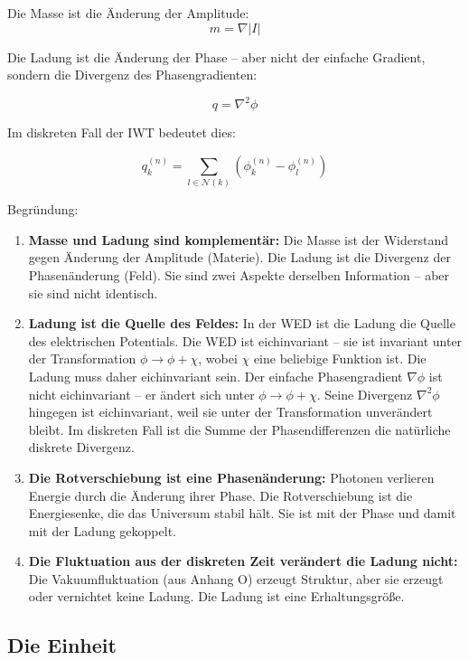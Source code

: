 Die Masse ist die Änderung der Amplitude:
\[
m = \nabla |I|
\]

Die Ladung ist die Änderung der Phase – aber nicht der einfache Gradient, sondern die Divergenz des Phasengradienten:

\[
q = \nabla^2 \phi
\]

Im diskreten Fall der IWT bedeutet dies:

\[
\boxed{q_k^{(n)} = \sum_{l \in \mathcal{N}(k)} \left( \phi_k^{(n)} - \phi_l^{(n)} \right)}
\]

Begründung:

\begin{enumerate}
\item \textbf{Masse und Ladung sind komplementär:} Die Masse ist der Widerstand gegen Änderung der Amplitude (Materie). Die Ladung ist die Divergenz der Phasenänderung (Feld). Sie sind zwei Aspekte derselben Information – aber sie sind nicht identisch.

\item \textbf{Ladung ist die Quelle des Feldes:} In der WED ist die Ladung die Quelle des elektrischen Potentials. Die WED ist eichinvariant – sie ist invariant unter der Transformation \( \phi \to \phi + \chi \), wobei \( \chi \) eine beliebige Funktion ist. Die Ladung muss daher eichinvariant sein. Der einfache Phasengradient \( \nabla \phi \) ist nicht eichinvariant – er ändert sich unter \( \phi \to \phi + \chi \). Seine Divergenz \( \nabla^2 \phi \) hingegen ist eichinvariant, weil sie unter der Transformation unverändert bleibt. Im diskreten Fall ist die Summe der Phasendifferenzen die natürliche diskrete Divergenz.

\item \textbf{Die Rotverschiebung ist eine Phasenänderung:} Photonen verlieren Energie durch die Änderung ihrer Phase. Die Rotverschiebung ist die Energiesenke, die das Universum stabil hält. Sie ist mit der Phase und damit mit der Ladung gekoppelt.

\item \textbf{Die Fluktuation aus der diskreten Zeit verändert die Ladung nicht:} Die Vakuumfluktuation (aus Anhang O) erzeugt Struktur, aber sie erzeugt oder vernichtet keine Ladung. Die Ladung ist eine Erhaltungsgröße.
\end{enumerate}

\subsection{Die Einheit}

